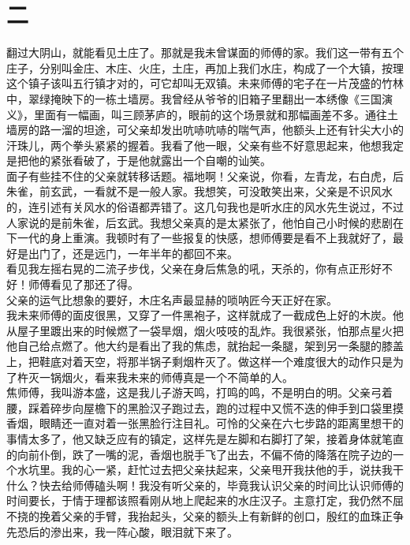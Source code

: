 \fancyhead[RO]{\thepage} %
\fancyhead[LE]{\thepage} %
\fancyfoot[LE,RO]{}
\fancyfoot[LO,CE]{}
\fancyfoot[CO,RE]{}
\chapter*{二}
翻过大阴山，就能看见土庄了。那就是我未曾谋面的师傅的家。我们这一带有五个庄子，分别叫金庄、木庄、火庄，土庄，再加上我们水庄，构成了一个大镇，按理这个镇子该叫五行镇才对的，可它却叫无双镇。未来师傅的宅子在一片茂盛的竹林中，翠绿掩映下的一栋土墙房。我曾经从爷爷的旧箱子里翻出一本绣像《三国演义》，里面有一幅画，叫三顾茅庐的，眼前的这个场景就和那幅画差不多。通往土墙房的路一溜的坦途，可父亲却发出吭哧吭哧的喘气声，他额头上还有针尖大小的汗珠儿，两个拳头紧紧的握着。我看了他一眼，父亲有些不好意思起来，他想我定是把他的紧张看破了，于是他就露出一个自嘲的讪笑。\\

面子有些挂不住的父亲就转移话题。福地啊！父亲说，你看，左青龙，右白虎，后朱雀，前玄武，一看就不是一般人家。我想笑，可没敢笑出来，父亲是不识风水的，连引述有关风水的俗语都弄错了。这几句我也是听水庄的风水先生说过，不过人家说的是前朱雀，后玄武。我想父亲真的是太紧张了，他怕自己小时候的悲剧在下一代的身上重演。我顿时有了一些报复的快感，想师傅要是看不上我就好了，最好是出门了，还是远门，一年半年的都回不来。
\\

看见我左摇右晃的二流子步伐，父亲在身后焦急的吼，天杀的，你有点正形好不好！师傅看见了那还了得。
\\

父亲的运气比想象的要好，木庄名声最显赫的唢呐匠今天正好在家。
\\

我未来师傅的面皮很黑，又穿了一件黑袍子，这样就成了一截成色上好的木炭。他从屋子里踱出来的时候燃了一袋旱烟，烟火吱吱的乱炸。我很紧张，怕那点星火把他自己给点燃了。他大约是看出了我的焦虑，就抬起一条腿，架到另一条腿的膝盖上，把鞋底对着天空，将那半锅子剩烟杵灭了。做这样一个难度很大的动作只是为了杵灭一锅烟火，看来我未来的师傅真是一个不简单的人。
\\

焦师傅，我叫游本盛，这是我儿子游天鸣，打鸣的鸣，不是明白的明。父亲弓着腰，踩着碎步向屋檐下的黑脸汉子跑过去，跑的过程中又慌不迭的伸手到口袋里摸香烟，眼睛还一直对着一张黑脸行注目礼。可怜的父亲在六七步路的距离里想干的事情太多了，他又缺乏应有的镇定，这样先是左脚和右脚打了架，接着身体就笔直的向前仆倒，跌了一嘴的泥，香烟也脱手飞了出去，不偏不倚的降落在院子边的一个水坑里。我的心一紧，赶忙过去把父亲扶起来，父亲甩开我扶他的手，说扶我干什么？快去给师傅磕头啊！我没有听父亲的，毕竟我认识父亲的时间比认识师傅的时间要长，于情于理都该照看刚从地上爬起来的水庄汉子。主意打定，我仍然不屈不挠的挽着父亲的手臂，我抬起头，父亲的额头上有新鲜的创口，殷红的血珠正争先恐后的滲出来，我一阵心酸，眼泪就下来了。
\\

